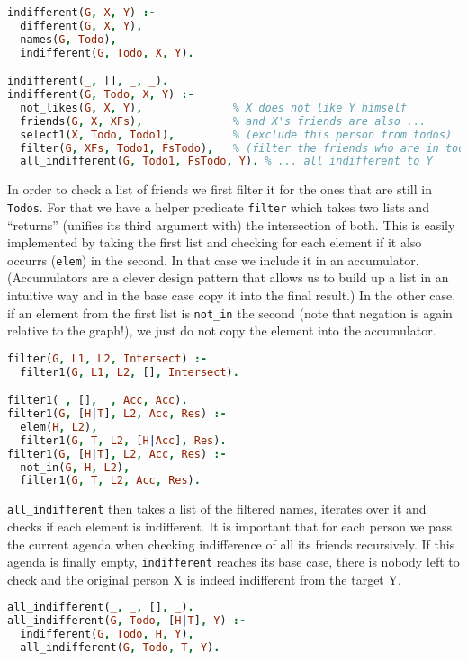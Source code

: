 \documentclass{article}
\begin{document}
\begin{lstlisting}[language=Prolog]
indifferent(G, X, Y) :-
  different(G, X, Y),
  names(G, Todo),
  indifferent(G, Todo, X, Y).

indifferent(_, [], _, _).
indifferent(G, Todo, X, Y) :-
  not_likes(G, X, Y),              % X does not like Y himself
  friends(G, X, XFs),              % and X's friends are also ...
  select1(X, Todo, Todo1),         % (exclude this person from todos)
  filter(G, XFs, Todo1, FsTodo),   % (filter the friends who are in todos)
  all_indifferent(G, Todo1, FsTodo, Y). % ... all indifferent to Y
\end{lstlisting}

In order to check a list of friends we first filter it for the ones that are
still in \texttt{Todos}. For that we have a helper predicate \texttt{filter}
which takes two lists and ``returns'' (unifies its third argument with) the
intersection of both. This is easily implemented by taking the first list and
checking for each element if it also occurrs (\texttt{elem}) in the second.
In that case we include it in an accumulator. (Accumulators are a clever design
pattern that allows us to build up a list in an intuitive way and in the base
case copy it into the final result.)
In the other case, if an element from the first list is \texttt{not\_in} the
second (note that negation is again relative to the graph!), we just do not copy
the element into the accumulator.

\begin{lstlisting}[language=Prolog]
filter(G, L1, L2, Intersect) :-
  filter1(G, L1, L2, [], Intersect).

filter1(_, [], _, Acc, Acc).
filter1(G, [H|T], L2, Acc, Res) :-
  elem(H, L2),
  filter1(G, T, L2, [H|Acc], Res).
filter1(G, [H|T], L2, Acc, Res) :-
  not_in(G, H, L2),
  filter1(G, T, L2, Acc, Res).
\end{lstlisting}

\texttt{all\_indifferent} then takes a list of the filtered names, iterates over it and
checks if each element is indifferent. It is important that for each person
we pass the current agenda when checking indifference of all its friends
recursively. If this agenda is finally empty, \texttt{indifferent} reaches its
base case, there is nobody left to check and the original person X is indeed
indifferent from the target Y.

\begin{lstlisting}[language=Prolog]
all_indifferent(_, _, [], _).
all_indifferent(G, Todo, [H|T], Y) :-
  indifferent(G, Todo, H, Y),
  all_indifferent(G, Todo, T, Y).
\end{lstlisting}
\end{document}
